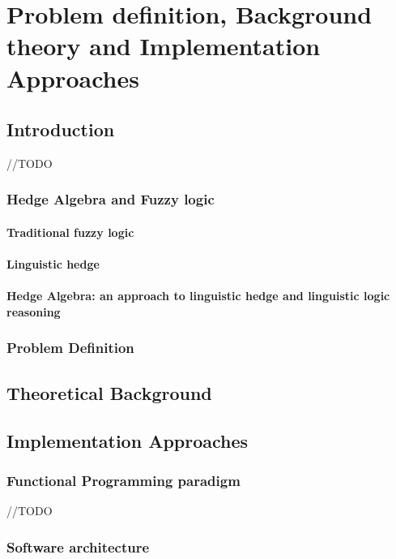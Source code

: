 \documentclass[../gr-final.tex]{subfiles}
\begin{document}
\part{Problem definition, Background theory and Implementation Approaches}
\chapter{Introduction}
{\huge //TODO}
\section{Hedge Algebra and Fuzzy logic}
\subsection{Traditional fuzzy logic}
\subsection{Linguistic hedge}
\subsection{Hedge Algebra: an approach to linguistic hedge and
  linguistic logic reasoning}
\section{Problem Definition}
\chapter{Theoretical Background}




\chapter{Implementation Approaches} 
\section{Functional Programming paradigm}
{\huge //TODO}
\section{Software architecture}
\end{document}

